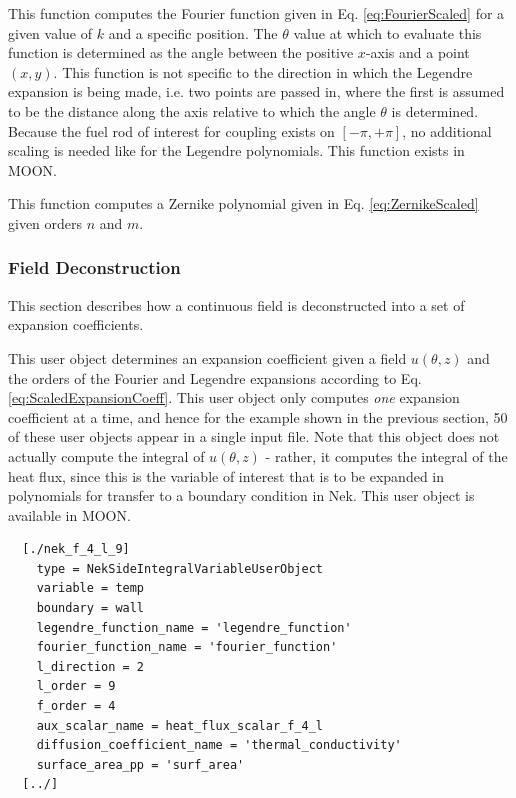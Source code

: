 \documentclass[10pt]{article}
\newcounter{subsubsubsection}[subsubsection]
\numberwithin{equation}{section} %
\begin{document}
This function computes the Fourier function given in Eq. \eqref{eq:FourierScaled} for a given value of \(k\) and a specific position. The \(\theta\) value at which to evaluate this function is determined as the angle between the positive \(x\)-axis and a point \((x,y)\). This function is not specific to the direction in which the Legendre expansion is being made, i.e. two points are passed in, where the first is assumed to be the distance along the axis relative to which the angle \(\theta\) is determined. Because the fuel rod of interest for coupling exists on \([-\pi, +\pi]\), no additional scaling is needed like for the Legendre polynomials. This function exists in MOON.

This function computes a Zernike polynomial given in Eq. \eqref{eq:ZernikeScaled} given orders \(n\) and \(m\). 

\subsubsection{Field Deconstruction}
This section describes how a continuous field is deconstructed into a set of expansion coefficients. 

This user object determines an expansion coefficient given a field \(u(\theta, z)\) and the orders of the Fourier and Legendre expansions according to Eq. \eqref{eq:ScaledExpansionCoeff}. This user object only computes {\it one} expansion coefficient at a time, and hence for the example shown in the previous section, 50 of these user objects appear in a single input file. Note that this object does not actually compute the integral of \(u(\theta, z)\) - rather, it computes the integral of the heat flux, since this is the variable of interest that is to be expanded in polynomials for transfer to a boundary condition in Nek. This user object is available in MOON.

\begin{lstlisting}
  [./nek_f_4_l_9]
    type = NekSideIntegralVariableUserObject
    variable = temp
    boundary = wall
    legendre_function_name = 'legendre_function'
    fourier_function_name = 'fourier_function'
    l_direction = 2
    l_order = 9
    f_order = 4
    aux_scalar_name = heat_flux_scalar_f_4_l
    diffusion_coefficient_name = 'thermal_conductivity'
    surface_area_pp = 'surf_area'
  [../]
\end{lstlisting}
\end{document}

